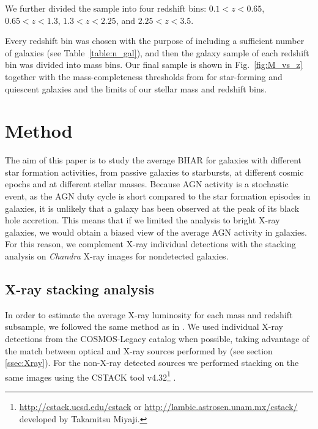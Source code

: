 We further divided the sample into four redshift bins: $0.1<z<0.65$, $0.65<z<1.3$, $1.3<z<2.25$, and $2.25<z<3.5$.

Every redshift bin was chosen with the purpose of including a sufficient number of galaxies (see Table~\ref{table:n_gal}), and then the galaxy sample of each redshift bin was divided into mass bins. Our final sample is shown in Fig.~\ref{fig:M_vs_z} together with the mass-completeness thresholds from \citet{2016ApJS..224...24L} for star-forming and quiescent galaxies and the limits of our stellar mass and redshift bins. 

\section{Method} \label{sec:method}
The aim of this paper is to study the average BHAR for galaxies with different star formation activities, from passive galaxies to starbursts, at different cosmic epochs and at different stellar masses. Because AGN activity is a stochastic event, as the AGN duty cycle is short compared to the star formation episodes in galaxies, it is unlikely that a galaxy has been observed at the peak of its black hole accretion. This means that if we limited the analysis to bright X-ray galaxies, we would obtain a biased view of the average AGN activity in
galaxies. For this reason, we complement X-ray individual detections with the stacking analysis on \textit{Chandra} X-ray images for nondetected galaxies. 

\subsection{X-ray stacking analysis} \label{sec:stacking}
In order to estimate the average X-ray luminosity for each mass and redshift subsample, we followed the same method as in \citet{2015ApJ...800L..10R}. We used individual X-ray detections from the COSMOS-Legacy catalog \citep{2016ApJ...819...62C} when possible, taking advantage of the match between optical and X-ray sources performed by \citet{2016ApJ...817...34M} (see section \ref{ssec:Xray}). For the non-X-ray detected sources we performed stacking on the same images using the CSTACK tool v4.32\footnote{\url{http://cstack.ucsd.edu/cstack} or \url{http://lambic.astrosen.unam.mx/cstack/} developed by Takamitsu Miyaji.}  \citep{2008HEAD...10.0401M}.

